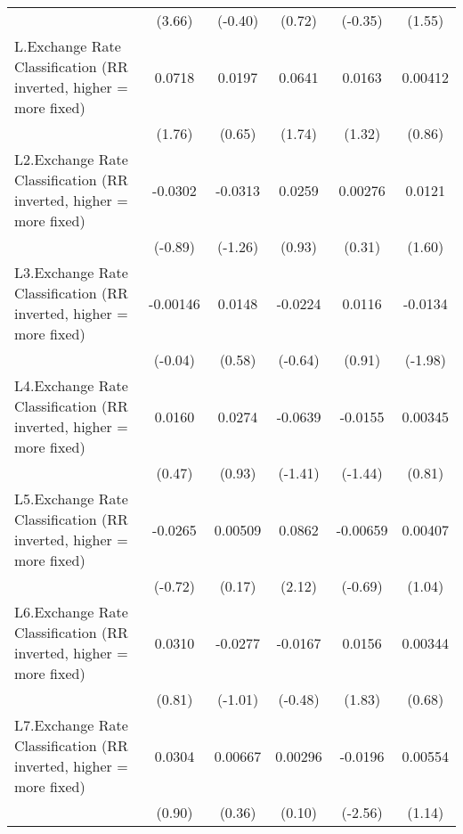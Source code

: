 {\begin{longtable}{l*{5}{c}}
                &   (3.66)         &  (-0.40)         &   (0.72)         &  (-0.35)         &   (1.55)         \\
[1em]
L.Exchange Rate Classification (RR inverted, higher = more fixed)&   0.0718         &   0.0197         &   0.0641         &   0.0163         &  0.00412         \\
                &   (1.76)         &   (0.65)         &   (1.74)         &   (1.32)         &   (0.86)         \\
[1em]
L2.Exchange Rate Classification (RR inverted, higher = more fixed)&  -0.0302         &  -0.0313         &   0.0259         &  0.00276         &   0.0121         \\
                &  (-0.89)         &  (-1.26)         &   (0.93)         &   (0.31)         &   (1.60)         \\
[1em]
L3.Exchange Rate Classification (RR inverted, higher = more fixed)& -0.00146         &   0.0148         &  -0.0224         &   0.0116         &  -0.0134\sym{*}  \\
                &  (-0.04)         &   (0.58)         &  (-0.64)         &   (0.91)         &  (-1.98)         \\
[1em]
L4.Exchange Rate Classification (RR inverted, higher = more fixed)&   0.0160         &   0.0274         &  -0.0639         &  -0.0155         &  0.00345         \\
                &   (0.47)         &   (0.93)         &  (-1.41)         &  (-1.44)         &   (0.81)         \\
[1em]
L5.Exchange Rate Classification (RR inverted, higher = more fixed)&  -0.0265         &  0.00509         &   0.0862\sym{*}  & -0.00659         &  0.00407         \\
                &  (-0.72)         &   (0.17)         &   (2.12)         &  (-0.69)         &   (1.04)         \\
[1em]
L6.Exchange Rate Classification (RR inverted, higher = more fixed)&   0.0310         &  -0.0277         &  -0.0167         &   0.0156         &  0.00344         \\
                &   (0.81)         &  (-1.01)         &  (-0.48)         &   (1.83)         &   (0.68)         \\
[1em]
L7.Exchange Rate Classification (RR inverted, higher = more fixed)&   0.0304         &  0.00667         &  0.00296         &  -0.0196\sym{*}  &  0.00554         \\
                &   (0.90)         &   (0.36)         &   (0.10)         &  (-2.56)         &   (1.14)         \\

\end{longtable}}
